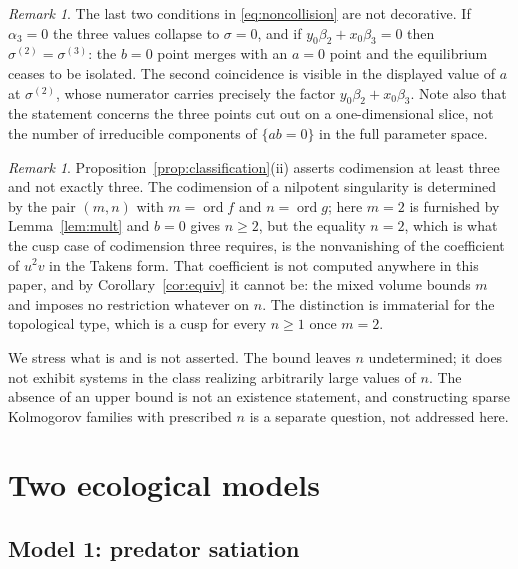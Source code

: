 \documentclass[12pt]{article}
\theoremstyle{plain}
\theoremstyle{definition}
\theoremstyle{remark}
\newtheorem{remark}[theorem]{Remark}
\DeclareMathOperator{\ordop}{ord}
\begin{document}
	\begin{remark}\label{rem:noncollision}
		The last two conditions in \eqref{eq:noncollision} are not decorative.
		If $\alpha_{3}=0$ the three values collapse to $\sigma=0$, and if
		$y_{0}\beta_{2}+x_{0}\beta_{3}=0$ then $\sigma^{(2)}=\sigma^{(3)}$: the
		$b=0$ point merges with an $a=0$ point and the equilibrium ceases to be
		isolated.  The second coincidence is visible in the displayed value of
		$a$ at $\sigma^{(2)}$, whose numerator carries precisely the factor
		$y_{0}\beta_{2}+x_{0}\beta_{3}$.  Note also that the statement
		concerns the three points cut out on a one-dimensional slice, not the
		number of irreducible components of $\{ab=0\}$ in the full parameter
		space.
	\end{remark}
	
	\begin{remark}\label{rem:exactcodim}
		Proposition~\ref{prop:classification}(ii) asserts codimension at least
		three and not exactly three.  The codimension of a nilpotent
		singularity is determined by the pair $(m,n)$ with $m=\ordop f$ and
		$n=\ordop g$; here $m=2$ is furnished by Lemma~\ref{lem:mult} and
		$b=0$ gives $n\ge2$, but the equality $n=2$, which is what the cusp
		case of codimension three requires, is the nonvanishing of the
		coefficient of $u^{2}v$ in the Takens form.  That coefficient is not
		computed anywhere in this paper, and by Corollary~\ref{cor:equiv} it
		cannot be: the mixed volume bounds $m$ and imposes no restriction
		whatever on $n$.  The distinction is immaterial for the topological
		type, which is a cusp for every $n\ge1$ once $m=2$.
		
		We stress what is and is not asserted.  The bound leaves $n$
		undetermined; it does not exhibit systems in the class realizing
		arbitrarily large values of $n$.  The absence of an upper bound is not
		an existence statement, and constructing sparse Kolmogorov families
		with prescribed $n$ is a separate question, not addressed here.
	\end{remark}
	
	
	\section{Two ecological models}\label{sec:models}
	
	\subsection{Model 1: predator satiation}
	
\end{document}
